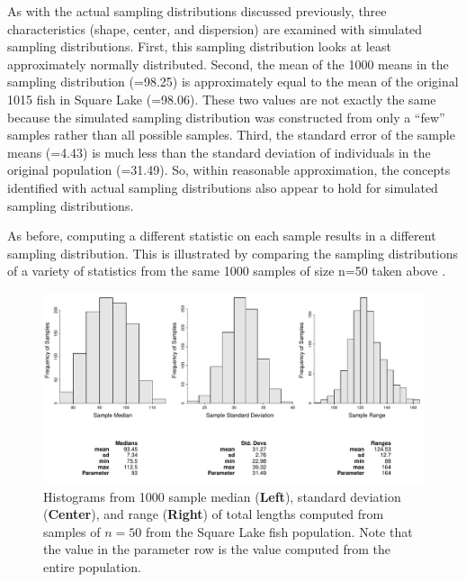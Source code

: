 \documentclass[10pt,openany]{book}\usepackage[]{graphicx}\usepackage[]{color}
\newenvironment{knitrout}{}{} %
\begin{document}
As with the actual sampling distributions discussed previously, three characteristics (shape, center, and dispersion) are examined with simulated sampling distributions.  First, this sampling distribution looks at least approximately normally distributed.  Second, the mean of the 1000 means in the sampling distribution (=98.25) is approximately equal to the mean of the original 1015 fish in Square Lake (=98.06).  These two values are not exactly the same because the simulated sampling distribution was constructed from only a ``few'' samples rather than all possible samples.  Third, the standard error of the sample means (=4.43) is much less than the standard deviation of individuals in the original population (=31.49).  So, within reasonable approximation, the concepts identified with actual sampling distributions also appear to hold for simulated sampling distributions.

As before, computing a different statistic on each sample results in a different sampling distribution.  This is illustrated by comparing the sampling distributions of a variety of statistics from the same 1000 samples of size n=50 taken above .

\begin{knitrout}
\color{fgcolor}\begin{figure}[hbtp]

{\centering \includegraphics[width=.95\linewidth]{Figs/SampDistSLOther50-1} 

}

\caption[Histograms from 1000 sample median (\textbf{Left}), standard deviation (\textbf{Center}), and range (\textbf{Right}) of total lengths computed from samples of $n=50$ from the Square Lake fish population]{Histograms from 1000 sample median (\textbf{Left}), standard deviation (\textbf{Center}), and range (\textbf{Right}) of total lengths computed from samples of $n=50$ from the Square Lake fish population.  Note that the value in the parameter row is the value computed from the entire population.}\label{fig:SampDistSLOther50}
\end{figure}


\end{knitrout}
\vspace{12pt}  %
\end{document}
